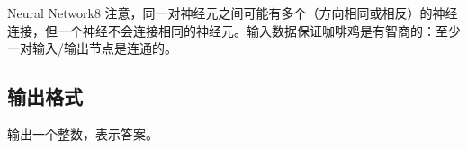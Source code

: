 \begin{Problem}{Neural Network}{8}
注意，同一对神经元之间可能有多个（方向相同或相反）的神经连接，但一个神经不会连接相同的神经元。输入数据保证咖啡鸡是有智商的：至少一对输入/输出节点是连通的。

\subsection*{输出格式}

输出一个整数，表示答案。

\setcounter{ExampleNo}{0}


\end{Problem}
